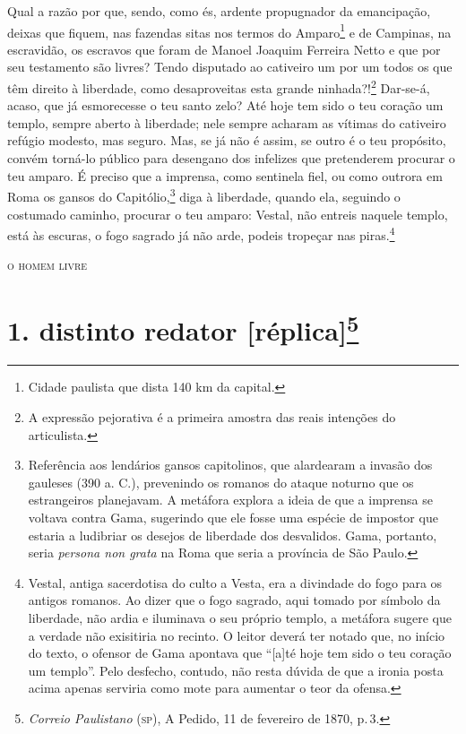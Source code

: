 Qual a razão por que, sendo, como és, ardente propugnador da
emancipação, deixas que fiquem, nas fazendas sitas nos termos do
Amparo\footnote{ Cidade paulista que dista 140 km da capital.} e de
Campinas, na escravidão, os escravos que foram de Manoel Joaquim
Ferreira Netto e que por seu testamento são livres? Tendo disputado ao
cativeiro um por um todos os que têm direito à liberdade, como
desaproveitas esta grande ninhada?!\footnote{ A expressão pejorativa é
  a primeira amostra das reais intenções do articulista.} Dar-se-á,
acaso, que já esmorecesse o teu santo zelo? Até hoje tem sido o teu
coração um templo, sempre aberto à liberdade; nele sempre acharam as
vítimas do cativeiro refúgio modesto, mas seguro. Mas, se já não é
assim, se outro é o teu propósito, convém torná-lo público para
desengano dos infelizes que pretenderem procurar o teu amparo. É preciso
que a imprensa, como sentinela fiel, ou como outrora em Roma os gansos
do Capitólio,\footnote{ Referência aos lendários gansos capitolinos,
  que alardearam a invasão dos gauleses (390 a. C.), prevenindo os
  romanos do ataque noturno que os estrangeiros planejavam. A metáfora
  explora a ideia de que a imprensa se voltava contra Gama, sugerindo
  que ele fosse uma espécie de impostor que estaria a ludibriar os
  desejos de liberdade dos desvalidos. Gama, portanto, seria
  \emph{persona non grata} na Roma que seria a província de São Paulo.}
diga à liberdade, quando ela, seguindo o costumado caminho, procurar o
teu amparo: Vestal, não entreis naquele templo, está às escuras, o fogo
sagrado já não arde, podeis tropeçar nas piras.\footnote{ Vestal,
  antiga sacerdotisa do culto a Vesta, era a divindade do fogo para os
  antigos romanos. Ao dizer que o fogo sagrado, aqui tomado por símbolo
  da liberdade, não ardia e iluminava o seu próprio templo, a metáfora
  sugere que a verdade não exisitiria no recinto. O leitor deverá ter
  notado que, no início do texto, o ofensor de Gama apontava que
  ``{[}a{]}té hoje tem sido o teu coração um templo''. Pelo desfecho,
  contudo, não resta dúvida de que a ironia posta acima apenas serviria
  como mote para aumentar o teor da ofensa.}

\begin{flushright}
\textsc{o homem livre}
\end{flushright}

\chapter{1. distinto redator {[}réplica{]}\footnote{\emph{Correio Paulistano} (\textsc{sp}), A Pedido, 11 de fevereiro de 1870,
  p.\,3.}} %

